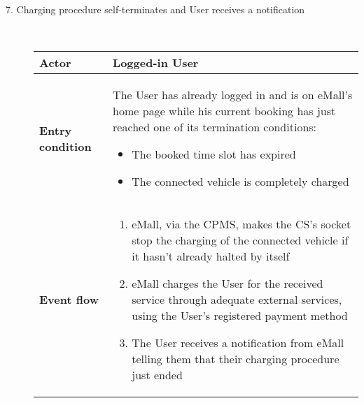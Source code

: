 \documentclass[11pt]{article}
\begin{document}
\begin{description}
    \item [7. Charging procedure self-terminates and User receives a notification] \hfill \\
    \begin{table}[H]
        \centering
        \setlength{\tabcolsep}{18pt}
        \renewcommand{\arraystretch}{1.4}
        \begin{tabularx}{\textwidth}{|>{\hsize=0.5\hsize}X|>{\hsize=1.5\hsize}X|}
            \hline
            \textbf{Actor} & Logged-in User \\
            \hline
            \textbf{Entry condition} & The User has already logged in and is on eMall's home page while his current booking has just reached one of its termination conditions:
            \begin{minipage}[t]{\hsize}
            \begin{itemize}
                \item The booked time slot has expired
                \item The connected vehicle is completely charged
            \end{itemize}
            \end{minipage}
            \vspace{6pt}
            \\
            \hline
            \textbf{Event flow} & 
                \begin{minipage}[t]{\hsize}
                \begin{enumerate}[topsep=0pt, leftmargin=*]
                    \item eMall, via the CPMS, makes the CS's socket stop the charging of the connected vehicle if it hasn't already halted by itself
                    \item eMall charges the User for the received service through adequate external services, using the User’s registered payment method
                    \item The User receives a notification from eMall telling them that their charging procedure just ended
                \end{enumerate}
                \end{minipage}
                \vspace{6pt}
            \\
            \hline

\end{tabularx}
\end{table}
\end{description}
\end{document}
